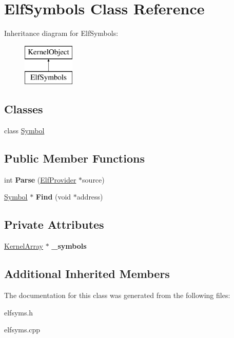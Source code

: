 \hypertarget{class_elf_symbols}{}\section{Elf\+Symbols Class Reference}
\label{class_elf_symbols}
Inheritance diagram for Elf\+Symbols\+:\begin{figure}[H]
\begin{center}
\leavevmode
\includegraphics[height=2.000000cm]{class_elf_symbols}
\end{center}
\end{figure}
\subsection*{Classes}
\begin{DoxyCompactItemize}
\item 
class \hyperlink{class_elf_symbols_1_1_symbol}{Symbol}
\end{DoxyCompactItemize}
\subsection*{Public Member Functions}
\begin{DoxyCompactItemize}
\item 
\mbox{\label{class_elf_symbols_ac304a4890081cb18f6cffe7a3384e54b}} 
int {\bfseries Parse} (\hyperlink{class_elf_provider}{Elf\+Provider} $\ast$source)
\item 
\mbox{\label{class_elf_symbols_a19cbe406d6752e860452252d72a97bb6}} 
\hyperlink{class_elf_symbols_1_1_symbol}{Symbol} $\ast$ {\bfseries Find} (void $\ast$address)
\end{DoxyCompactItemize}
\subsection*{Private Attributes}
\begin{DoxyCompactItemize}
\item 
\mbox{\label{class_elf_symbols_af33e568ee51c7020bf90dbf59d1e5807}} 
\hyperlink{class_kernel_array}{Kernel\+Array} $\ast$ {\bfseries \+\_\+symbols}
\end{DoxyCompactItemize}
\subsection*{Additional Inherited Members}


The documentation for this class was generated from the following files\+:\begin{DoxyCompactItemize}
\item 
elfsyms.\+h\item 
elfsyms.\+cpp\end{DoxyCompactItemize}
